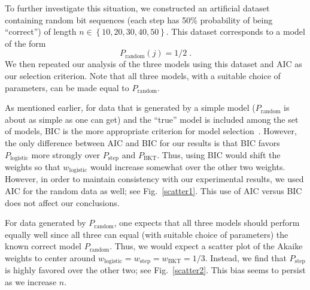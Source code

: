 \documentclass{acmlarge-edm}
\begin{document}
To further investigate this situation, we constructed an
artificial dataset containing random bit sequences (each
step has 50\% probability of being ``correct'') of length 
$n\in\left\{10,20,30,40,50\right\}$.
This dataset corresponds to a model of the form
%
\begin{equation}
        P_\mathrm{random}(j)=1/2 \; .
\end{equation}
%
We then repeated our analysis of the three models using this dataset
and AIC as our selection criterion.  Note that all three models,
with a suitable choice of parameters, can be made equal to 
$P_\mathrm{random}$.

As mentioned earlier, for data that is generated by a simple 
model ($P_\mathrm{random}$ is about as
simple as one can get) and the ``true'' model is included among
the set of models, BIC is the more appropriate criterion
for model selection~\cite[Sections~6.3 \& 6.4]{burnham_model_2002}.
However, the only difference between AIC and BIC for our results is that BIC favors
$P_\mathrm{logistic}$ more strongly over $P_\mathrm{step}$ and
$P_\mathrm{BKT}$.  Thus, using BIC would shift the weights so that
$w_\mathrm{logistic}$ would increase somewhat over the other two
weights.  However, in order to maintain consistency with
our experimental results, we used AIC for the random data as well;
see Fig.~\ref{scatter1}.  This use of AIC versus BIC does not 
affect our conclusions.

For data generated by $P_\mathrm{random}$,
one expects that all three models should perform equally
well since all three can equal (with suitable choice of parameters)
the known correct model $P_\mathrm{random}$.  Thus, we would expect
a scatter plot of the Akaike weights to center around
$w_\mathrm{logistic}=w_\mathrm{step}=w_\mathrm{BKT}=1/3$.  Instead, we
find that $P_\mathrm{step}$ is highly favored over the other two; see
Fig.~\ref{scatter2}. This bias seems to persist as we increase $n$.
\end{document}
